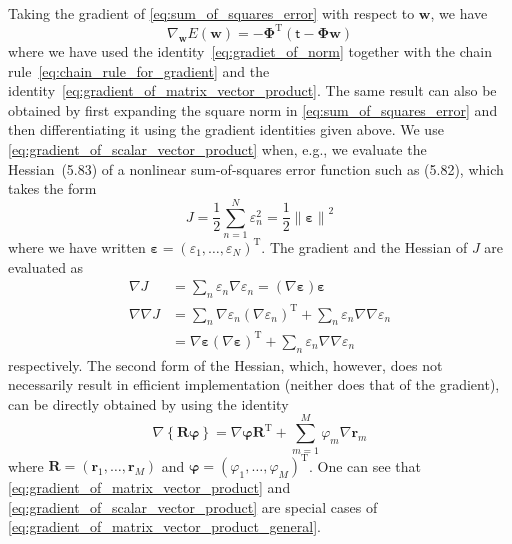 \documentclass[12pt,a4paper]{article}
\begin{document}
Taking the gradient of \eqref{eq:sum_of_squares_error} with respect to $\mathbf{w}$, we have
\begin{equation}
\nabla_{\mathbf{w}} E(\mathbf{w}) =
-\bm{\Phi}^{\operatorname{T}} \left( \bm{\mathsf{t}} - \bm{\Phi}\mathbf{w} \right)
\end{equation}
where we have used the identity~\eqref{eq:gradiet_of_norm} together with
the chain rule~\eqref{eq:chain_rule_for_gradient} and
the identity~\eqref{eq:gradient_of_matrix_vector_product}.
The same result can also be obtained by first expanding the square norm in
\eqref{eq:sum_of_squares_error} and then differentiating it using the gradient identities
given above.
We use \eqref{eq:gradient_of_scalar_vector_product}
when, e.g., we evaluate the Hessian~(5.83) of a nonlinear sum-of-squares error function
such as (5.82), which takes the form
\begin{equation}
J = \frac{1}{2} \sum_{n=1}^{N} \varepsilon_n^{2} = \frac{1}{2} \left\|\bm{\varepsilon}\right\|^2
\end{equation}
where we have written
$\bm{\varepsilon} = \left(\varepsilon_1, \dots, \varepsilon_N\right)^{\operatorname{T}}$.
The gradient and the Hessian of $J$ are evaluated as
\begin{align}
\nabla J &= \sum_{n} \varepsilon_n \nabla \varepsilon_n
= \left( \nabla \bm{\varepsilon} \right) \bm{\varepsilon} \\
\nabla\nabla J &= \sum_{n} \nabla\varepsilon_n \left(\nabla\varepsilon_n\right)^{\operatorname{T}}
+ \sum_{n} \varepsilon_n \nabla\nabla \varepsilon_n \\
&= \nabla \bm{\varepsilon} \left( \nabla \bm{\varepsilon} \right)^{\operatorname{T}}
+ \sum_{n} \varepsilon_n \nabla\nabla \varepsilon_n
\end{align}
respectively.
The second form of the Hessian,
which, however, does not necessarily result in efficient implementation
(neither does that of the gradient),
can be directly obtained by using the identity
\begin{equation}
\nabla \left\{ \mathbf{R} \bm{\varphi} \right\}
= \nabla \bm{\varphi} \mathbf{R}^{\operatorname{T}} + \sum_{m=1}^{M} \varphi_m \nabla \mathbf{r}_m
\label{eq:gradient_of_matrix_vector_product_general}
\end{equation}
where $\mathbf{R} = \left(\mathbf{r}_1, \dots, \mathbf{r}_M\right)$ and
$\bm{\varphi} = \left(\varphi_1, \dots, \varphi_M\right)^{\operatorname{T}}$.
One can see that
\eqref{eq:gradient_of_matrix_vector_product} and
\eqref{eq:gradient_of_scalar_vector_product}
are special cases of
\eqref{eq:gradient_of_matrix_vector_product_general}.
\end{document}
